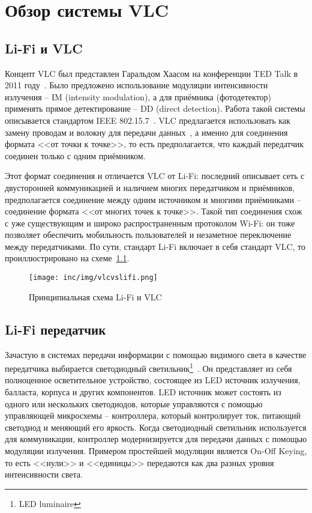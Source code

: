 \chapter{Обзор системы VLC}

\section{Li-Fi и VLC}


Концепт VLC был представлен Гаральдом Хаасом на конференции TED Talk в 2011 году~\cite{Haas2011}. Было предложено использование модуляции интенсивности излучения \--- IM (intensity modulation), а для приёмника (фотодетектор) применять прямое детектирование \--- DD (direct detection). Работа такой системы описывается стандартом IEEE 802.15.7~\cite{IEEE2018}. VLC предлагается использовать как замену проводам и волокну для передачи данных~\cite{Haas16}, а именно для соединения формата <<от точки к точке>>, то есть предполагается, что каждый передатчик соединен только с одним приёмником.

Этот формат соединения и отличается VLC от Li-Fi: последний описывает сеть с двусторонней коммуникацией и наличием многих передатчиком и приёмников, предполагается соединение между одним источником и многими приёмниками \--- соединение формата <<от многих точек к точке>>. Такой тип соединения схож с уже существующим и широко распространенным протоколом Wi-Fi: он тоже позволяет обеспечить мобильность пользователей и незаметное переключение между передатчиками. По сути, стандарт Li-Fi включает в себя стандарт VLC, то проиллюстрировано на схеме~\ref{fig:vlcvslifi}.

\begin{figure}[!ht]
    \centering
    \texttt{[image: inc/img/vlcvslifi.png]}
    \caption{Принципиальная схема Li-Fi и VLC~\cite{Haas16}}
    \label{fig:vlcvslifi}
\end{figure}

\section{Li-Fi передатчик}

Зачастую в системах передачи информации с помощью видимого света в качестве передатчика выбирается светодиодный светильник\footnote{LED luminaire}~\cite{LeMinh2008,Komine2006,Komine2004}. Он представляет из себя полноценное осветительное устройство, состоящее из LED источник излучения, балласта, корпуса и других компонентов. LED источник может состоять из одного или нескольких светодиодов, которые управляются с помощью управляющей микросхемы \--- контроллера, который контролирует ток, питающий светодиод и меняющий его яркость. Когда светодиодный светильник используется для коммуникации, контроллер модернизируется для передачи данных с помощью модуляции излучения. Примером простейшей модуляции является On-Off Keying, то есть <<нули>> и <<единицы>> передаются как два разных уровня интенсивности света.

